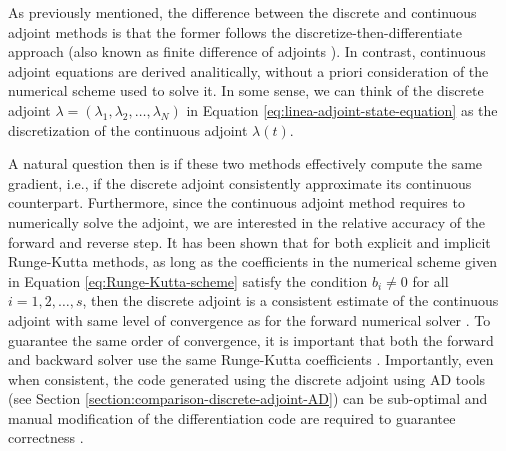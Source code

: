As previously mentioned, the difference between the discrete and continuous adjoint methods is that the former follows the discretize-then-differentiate approach (also known as finite difference of adjoints \cite{Sirkes_Tziperman_1997}).
In contrast, continuous adjoint equations are derived analitically, without a priori consideration of the numerical scheme used to solve it. 
In some sense, we can think of the discrete adjoint $\lambda = (\lambda_1, \lambda_2, \ldots, \lambda_N)$ in Equation \eqref{eq:linea-adjoint-state-equation} as the discretization of the continuous adjoint $\lambda(t)$. 

A natural question then is if these two methods effectively compute the same gradient, i.e., if the discrete adjoint consistently approximate its continuous counterpart. 
Furthermore, since the continuous adjoint method requires to numerically solve the adjoint, we are interested in the relative accuracy of the forward and reverse step. 
It has been shown that for both explicit and implicit Runge-Kutta methods, as long as the coefficients in the numerical scheme given in Equation \eqref{eq:Runge-Kutta-scheme} satisfy the condition $b_i \neq 0$ for all $i=1,2, \ldots, s$, then the discrete adjoint is a consistent estimate of the continuous adjoint with same level of convergence as for the forward numerical solver \cite{Hager_2000,Walther_2007, sandu2006properties, sandu2011solution}.
To guarantee the same order of convergence, it is important that both the forward and backward solver use the same Runge-Kutta coefficients \cite{Alexe_Sandu_2009}.
Importantly, even when consistent, the code generated using the discrete adjoint using AD tools (see Section \ref{section:comparison-discrete-adjoint-AD}) can be sub-optimal and manual modification of the differentiation code are required to guarantee correctness \cite{Eberhard_Bischof_1996, alexe2007denserks}.




